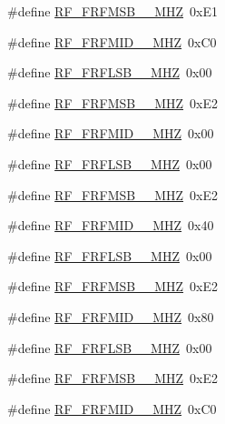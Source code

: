 \begin{DoxyCompactItemize}
\item 
\#define \mbox{\hyperlink{sx1276_regs-_fsk_8h_a20b708b5fdc452b10f5c014592235ed4}{R\+F\+\_\+\+F\+R\+F\+M\+S\+B\+\_\+\_\+\+M\+HZ}}~0x\+E1
\item 
\#define \mbox{\hyperlink{sx1276_regs-_fsk_8h_ad673e935e767a6107b7ed126f2b0e020}{R\+F\+\_\+\+F\+R\+F\+M\+I\+D\+\_\+\_\+\+M\+HZ}}~0x\+C0
\item 
\#define \mbox{\hyperlink{sx1276_regs-_fsk_8h_a9b654fee5670a21e74b9b3f2a71d1929}{R\+F\+\_\+\+F\+R\+F\+L\+S\+B\+\_\+\_\+\+M\+HZ}}~0x00
\item 
\#define \mbox{\hyperlink{sx1276_regs-_fsk_8h_ac103def8b55db2e68ecd74f622d05ec8}{R\+F\+\_\+\+F\+R\+F\+M\+S\+B\+\_\+\_\+\+M\+HZ}}~0x\+E2
\item 
\#define \mbox{\hyperlink{sx1276_regs-_fsk_8h_a68c181778920969fd320960aa9b8540a}{R\+F\+\_\+\+F\+R\+F\+M\+I\+D\+\_\+\_\+\+M\+HZ}}~0x00
\item 
\#define \mbox{\hyperlink{sx1276_regs-_fsk_8h_ad6aa652c01dd83e83eee08310a4ab27d}{R\+F\+\_\+\+F\+R\+F\+L\+S\+B\+\_\+\_\+\+M\+HZ}}~0x00
\item 
\#define \mbox{\hyperlink{sx1276_regs-_fsk_8h_acf4419e259f3ac0eaa240b5d276f2783}{R\+F\+\_\+\+F\+R\+F\+M\+S\+B\+\_\+\_\+\+M\+HZ}}~0x\+E2
\item 
\#define \mbox{\hyperlink{sx1276_regs-_fsk_8h_a5805cba8302e2b4cc090072e27e9b74a}{R\+F\+\_\+\+F\+R\+F\+M\+I\+D\+\_\+\_\+\+M\+HZ}}~0x40
\item 
\#define \mbox{\hyperlink{sx1276_regs-_fsk_8h_a54bc243265f355ba3398eaf560182add}{R\+F\+\_\+\+F\+R\+F\+L\+S\+B\+\_\+\_\+\+M\+HZ}}~0x00
\item 
\#define \mbox{\hyperlink{sx1276_regs-_fsk_8h_a55862c6f4752ba5add661f520ef78d85}{R\+F\+\_\+\+F\+R\+F\+M\+S\+B\+\_\+\_\+\+M\+HZ}}~0x\+E2
\item 
\#define \mbox{\hyperlink{sx1276_regs-_fsk_8h_ab9eed26517ae9101715c14e1f6ebe36a}{R\+F\+\_\+\+F\+R\+F\+M\+I\+D\+\_\+\_\+\+M\+HZ}}~0x80
\item 
\#define \mbox{\hyperlink{sx1276_regs-_fsk_8h_a51b43142f8e6f359f3fa9a2de957b0d6}{R\+F\+\_\+\+F\+R\+F\+L\+S\+B\+\_\+\_\+\+M\+HZ}}~0x00
\item 
\#define \mbox{\hyperlink{sx1276_regs-_fsk_8h_ac90d9f82ccd48696f5f6d5f3da034c95}{R\+F\+\_\+\+F\+R\+F\+M\+S\+B\+\_\+\_\+\+M\+HZ}}~0x\+E2
\item 
\#define \mbox{\hyperlink{sx1276_regs-_fsk_8h_ae7d275a31f9ef6141362da97cbc82ba0}{R\+F\+\_\+\+F\+R\+F\+M\+I\+D\+\_\+\_\+\+M\+HZ}}~0x\+C0

\end{DoxyCompactItemize}
